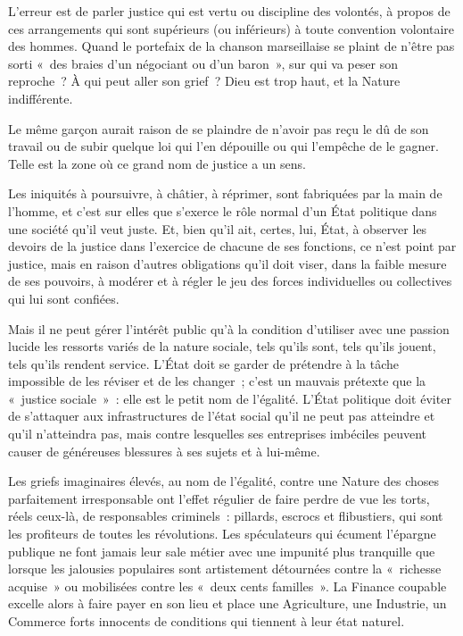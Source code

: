 \documentclass[french,twoside]{book} %
\begin{document}
L’erreur est de parler justice qui est vertu ou discipline des volontés, à propos de ces arrangements qui sont supérieurs (ou inférieurs) à toute convention volontaire des hommes. Quand le portefaix de la chanson marseillaise se plaint de n’être pas sorti « des braies d’un négociant ou d’un baron », sur qui va peser son reproche ? À qui peut aller son grief ? Dieu est trop haut, et la Nature indifférente.\par
Le même garçon aurait raison de se plaindre de n’avoir pas reçu le dû de son travail ou de subir quelque loi qui l’en dépouille ou qui l’empêche de le gagner. Telle est la zone où ce grand nom de justice a un sens.\par
Les iniquités à poursuivre, à châtier, à réprimer, sont fabriquées par la main de l’homme, et c’est sur elles que s’exerce le rôle normal d’un État politique dans une société qu’il veut juste. Et, bien qu’il ait, certes, lui, État, à observer les devoirs de la justice dans l’exercice de chacune de ses fonctions, ce n’est point par justice, mais en raison d’autres obligations qu’il doit viser, dans la faible mesure de ses pouvoirs, à modérer et à régler le jeu des forces individuelles ou collectives qui lui sont confiées.\par
Mais il ne peut gérer l’intérêt public qu’à la condition d’utiliser avec une passion lucide les ressorts variés de la nature sociale, tels qu’ils sont, tels qu’ils jouent, tels qu’ils rendent service. L’État doit se garder de prétendre à la tâche impossible de les réviser et de les changer ; c’est un mauvais prétexte que la « justice sociale » : elle est le petit nom de l’égalité. L’État politique doit éviter de s’attaquer aux infrastructures de l’état social qu’il ne peut pas atteindre et qu’il n’atteindra pas, mais contre lesquelles ses entreprises imbéciles peuvent causer de généreuses blessures à ses sujets et à lui-même.\par
Les griefs imaginaires élevés, au nom de l’égalité, contre une Nature des choses parfaitement irresponsable ont l’effet régulier de faire perdre de vue les torts, réels ceux-là, de responsables criminels : pillards, escrocs et flibustiers, qui sont les profiteurs de toutes les révolutions. Les spéculateurs qui écument l’épargne publique ne font jamais leur sale métier avec une impunité plus tranquille que lorsque les jalousies populaires sont artistement détournées contre la « richesse acquise » ou mobilisées contre les « deux cents familles ». La Finance coupable excelle alors à faire payer en son lieu et place une Agriculture, une Industrie, un Commerce forts innocents de conditions qui tiennent à leur état naturel.\par
\end{document}
